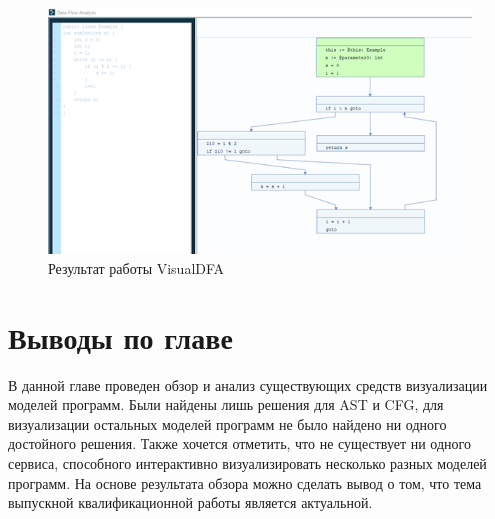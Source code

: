 \begin{figure}[h]
	\center
	\includegraphics [scale=1] {my_folder/images/my/10}
	\caption{Результат работы VisualDFA}
	\label{fig:10}
\end{figure}

\section{Выводы по главе} \label{ch2:sec2}
В данной главе проведен обзор и анализ существующих средств визуализации моделей программ. Были найдены лишь решения для AST и CFG, для визуализации остальных моделей программ не было найдено ни одного достойного решения. Также хочется отметить, что не существует ни одного сервиса, способного интерактивно визуализировать несколько разных моделей программ. На основе результата обзора можно сделать вывод о том, что тема выпускной квалификационной работы является актуальной.
\newpage












